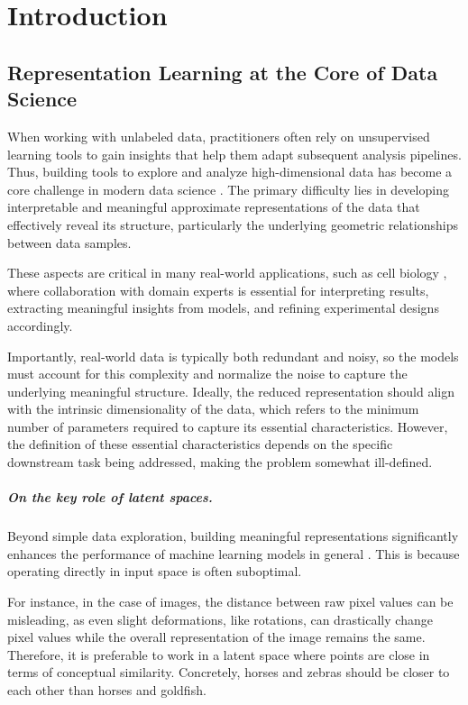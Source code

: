 \chapter{Introduction}\label{chap:intro}

\minitoc

\section{Representation Learning at the Core of Data Science}

When working with unlabeled data, practitioners often rely on unsupervised learning tools to gain insights that help them adapt subsequent analysis pipelines. Thus, building tools to explore and analyze high-dimensional data has become a core challenge in modern data science \citep{donoho2000high, rudin2022interpretable}. The primary difficulty lies in developing interpretable and meaningful approximate representations of the data that effectively reveal its structure, particularly the underlying geometric relationships between data samples.

These aspects are critical in many real-world applications, such as cell biology \citep{regev2017human, kobak2019art, becht2019dimensionality}, where collaboration with domain experts is essential for interpreting results, extracting meaningful insights from models, and refining experimental designs accordingly.

Importantly, real-world data is typically both redundant and noisy, so the models must account for this complexity and normalize the noise to capture the underlying meaningful structure. Ideally, the reduced representation should align with the intrinsic dimensionality of the data, which refers to the minimum number of parameters required to capture its essential characteristics. However, the definition of these essential characteristics depends on the specific downstream task being addressed, making the problem somewhat ill-defined.


\paragraph{On the key role of latent spaces.} 
Beyond simple data exploration, building meaningful representations significantly enhances the performance of machine learning models in general \citep{bengio2013representation}. This is because operating directly in input space is often suboptimal.

For instance, in the case of images, the distance between raw pixel values can be misleading, as even slight deformations, like rotations, can drastically change pixel values while the overall representation of the image remains the same. Therefore, it is preferable to work in a latent space where points are close in terms of conceptual similarity. Concretely, horses and zebras should be closer to each other than horses and goldfish.

